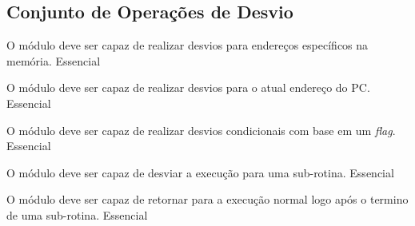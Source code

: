     \subsection{Conjunto de Operações de Desvio}
	    
	  \begin{functional}
		{O módulo deve ser capaz de realizar desvios para endereços específicos na memória.}
		{Essencial} 
		 
		 {O módulo deve ser capaz de realizar desvios para o atual endereço do PC.}
		 {Essencial}
		 
		 {O módulo deve ser capaz de realizar desvios condicionais com base em um \textit{flag}.}
		 {Essencial}
		 
		 {O módulo deve ser capaz de desviar a execução para uma sub-rotina.}
		 {Essencial}
		 
		 {O módulo deve ser capaz de retornar para a execução normal logo após o  termino de uma sub-rotina.}
		 {Essencial}
         
	  \end{functional}